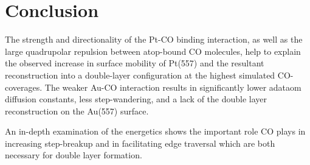 \documentclass[journal = jpccck, manuscript = article]{achemso}
\begin{document}





\section{Conclusion}
The strength and directionality of the Pt-CO binding interaction, as
well as the large quadrupolar repulsion between atop-bound CO
molecules, help to explain the observed increase in surface mobility
of Pt(557) and the resultant reconstruction into a double-layer
configuration at the highest simulated CO-coverages.  The weaker Au-CO
interaction results in significantly lower adataom diffusion
constants, less step-wandering, and a lack of the double layer
reconstruction on the Au(557) surface.

An in-depth examination of the energetics shows the important role CO
plays in increasing step-breakup and in facilitating edge traversal
which are both necessary for double layer formation.


\end{document}
